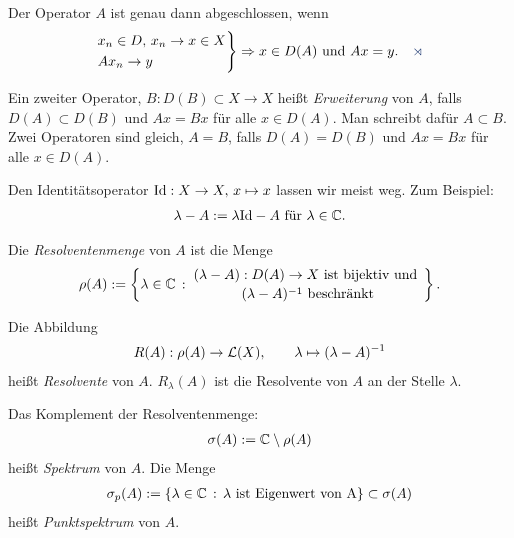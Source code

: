 \begin{lem*}
Der Operator $A$ ist
genau dann abgeschlossen, wenn
\begin{align*}
\begin{rcases}
x_n \in D,\, x_n \to x \in X\\
Ax_n\to y
\end{rcases}
\Rightarrow x \in D(A)\text{ und } Ax=y.\fishhere
\end{align*}
\end{lem*}

\begin{defn*}
Ein zweiter Operator, $B : D(B) \subset X \to X$ heißt
\emph{Erweiterung}
von $A$, falls $D(A) \subset D(B)$ und $Ax=Bx$ für alle $x \in D(A)$.
Man schreibt dafür $A\subset B$.
Zwei Operatoren sind gleich, $A=B$, falls $D(A)=D(B)$ und
$Ax = Bx$ für alle $x \in D(A)$.\fishhere
\end{defn*}

Den Identitätsoperator $\mathrm{Id} : X \to X,\, x \mapsto x$ lassen
wir meist weg.
Zum Beispiel:
\begin{align*}
\lambda-A := \lambda\mathrm{Id} - A \text{ für } \lambda \in \mathbb{C}.
\end{align*}

\begin{defn*}
\begin{defnenum}
\item
Die \emph{Resolventenmenge} von $A$ ist die Menge
\begin{align*}
\rho(A) := \setdef{\lambda \in \C}{\atop{(\lambda-A) : D(A) \to X \text{
ist bijektiv und }}{(\lambda-A)^{-1} \text{ beschränkt}}}.
\end{align*}
\item
Die Abbildung
\begin{align*}
R(A): \rho(A) \to \mathcal{L}(X),\qquad
\lambda  \mapsto  (\lambda-A)^{-1}
\end{align*}
heißt \emph{Resolvente} von $A$. $R_{\lambda}(A)$ ist die
Resolvente von $A$ an der Stelle $\lambda$.
\item
Das Komplement der Resolventenmenge:
\begin{align*}
  \sigma(A) := \mathbb{C} \setminus \rho(A)
\end{align*}
heißt \emph{Spektrum} von $A$. Die Menge
\begin{align*}
\sigma_p(A) := \left\{ \lambda \in \mathbb{C}\,:\,\lambda \text{ ist
Eigenwert von A}\right\}\subset \sigma(A)
\end{align*}
heißt \emph{Punktspektrum} von $A$.\fishhere  
\end{defnenum}
\end{defn*}

